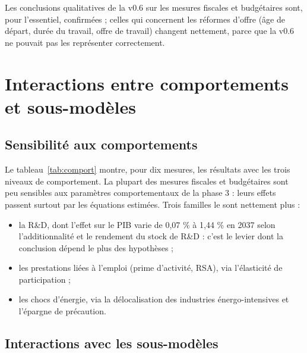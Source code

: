 \begin{resultat}
Les conclusions qualitatives de la v0.6 sur les mesures fiscales et budgétaires sont, pour l'essentiel, confirmées ;
celles qui concernent les réformes d'offre (âge de départ, durée du travail, offre de travail) changent nettement,
parce que la v0.6 ne pouvait pas les représenter correctement.
\end{resultat}

\chapter{Interactions entre comportements et sous-modèles}\label{ch:interactions}

\section{Sensibilité aux comportements}

Le tableau~\ref{tab:comport} montre, pour dix mesures, les résultats avec les trois niveaux de comportement. La
plupart des mesures fiscales et budgétaires sont peu sensibles aux paramètres comportementaux de la phase 3 : leurs
effets passent surtout par les équations estimées. Trois familles le sont nettement plus :
\begin{itemize}
\item la R\&D, dont l'effet sur le PIB varie de 0,07 \% à 1,44 \% en 2037 selon l'additionnalité et le rendement du stock
de R\&D : c'est le levier dont la conclusion dépend le plus des hypothèses ;
\item les prestations liées à l'emploi (prime d'activité, RSA), via l'élasticité de participation ;
\item les chocs d'énergie, via la délocalisation des industries énergo-intensives et l'épargne de précaution.
\end{itemize}

\begin{table}[htbp]\centering\scriptsize
\caption{Effets en 2037 selon le niveau des comportements (bas, central, haut).}\label{tab:comport}
\end{table}

\section{Interactions avec les sous-modèles}

